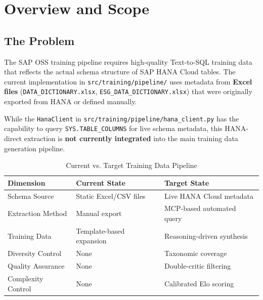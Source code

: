 \documentclass[11pt,a4paper]{article}
\begin{document}
\tableofcontents
\listoftables
\listoffigures
\newpage

\section{Overview and Scope}
\label{chap:overview}

\subsection{The Problem}

The SAP OSS training pipeline requires high-quality Text-to-SQL training data that reflects
the actual schema structure of SAP HANA Cloud tables. The current implementation in
\texttt{src/training/pipeline/} uses metadata from \textbf{Excel files}
(\texttt{DATA\_DICTIONARY.xlsx}, \texttt{ESG\_DATA\_DICTIONARY.xlsx}) that were originally
exported from HANA or defined manually.

While the \texttt{HanaClient} in \texttt{src/training/pipeline/hana\_client.py} has the
capability to query \texttt{SYS.TABLE\_COLUMNS} for live schema metadata, this HANA-direct
extraction is \textbf{not currently integrated} into the main training data generation
pipeline.

\begin{table}[H]
\centering
\caption{Current vs. Target Training Data Pipeline}
\label{tab:gap-analysis}
\begin{tabularx}{\textwidth}{lXX}
\toprule
\textbf{Dimension} & \textbf{Current State} & \textbf{Target State} \\
\midrule
Schema Source & Static Excel/CSV files & Live HANA Cloud metadata \\
Extraction Method & Manual export & MCP-based automated query \\
Training Data & Template-based expansion & Reasoning-driven synthesis \\
Diversity Control & None & Taxonomic coverage \\
Quality Assurance & None & Double-critic filtering \\
Complexity Control & None & Calibrated Elo scoring \\
\bottomrule
\end{tabularx}
\end{table}
\end{document}
